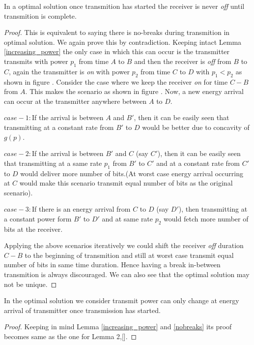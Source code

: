 \begin{lemma}
In a optimal solution once transmition has started the receiver is never \textit{off} until transmition is complete. \label{nobreaks}
\end{lemma}
\begin{proof}
This is equivalent to saying there is no-breaks during transmition in optimal solution. We again prove this by contradiction. Keeping intact Lemma \ref{increasing_power} the only case in which this can occur is the transmitter transmits with power $p_1$ from time $A$ to $B$ and then the receiver is \textit{off} from $B$ to $C$, again the transmitter is \textit{on} with power $p_2$ from time $C$ to $D$ with $p_1<p_2$ as shown in figure . Consider the case where we keep the receiver \textit{on} for time $C-B$ from $A$. This makes the scenario as shown in figure . Now, a new energy arrival can occur at the transmitter anywhere between $A$ to $D$. 

$case-1:$If the arrival is between $A$ and $B'$, then it can be easily seen that transmitting at a constant rate from $B'$ to $D$ would be better due to concavity of $g(p)$.

$case-2:$If the arrival is between $B'$ and $C$ (say $C'$), then it can be easily seen that transmitting at a same rate $p_1$ from $B'$ to $C'$ and  at a constant rate from $C'$ to $D$ would deliver more number of bits.(At worst case energy arrival occurring at $C$ would make this scenario transmit equal number of bits as the original scenario).

$case-3:$If there is an energy arrival from $C$ to $D$ (say $D'$), then transmitting at a constant power form $B'$ to $D'$ and at same rate $p_2$ would fetch more number of bits at the receiver.

Applying the above scenarios iteratively we could shift the receiver \textit{off} duration $C-B$ to the beginning of transmition and still at worst case transmit equal number of bits in same time duration. Hence having a break in-between transmition is always discouraged. We can also see that the optimal solution may not be unique.
\end{proof}

\begin{lemma}
In the optimal solution we consider transmit power can only change at energy arrival of transmitter once transmission has started. 
\end{lemma}
\begin{proof}
Keeping in mind Lemma \ref{increasing_power} and \ref{nobreaks} its proof becomes same as the one for Lemma 2,[]. 
\end{proof}